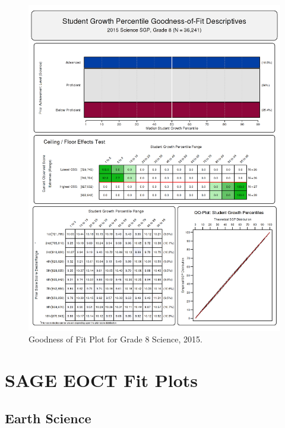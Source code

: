 \documentclass[12pt]{article}
\begin{document}
\begin{figure}[htbp]
\centering
\includegraphics{../img/Goodness_of_Fit/SCIENCE.2015/2015_SCIENCE_8;2014_SCIENCE_7;2013_SCIENCE_6;2012_SCIENCE_5;2011_SCIENCE_4.png}
\caption{Goodness of Fit Plot for Grade 8 Science, 2015.}
\end{figure}

\pagebreak

\section{SAGE EOCT Fit Plots}\label{sage-eoct-fit-plots}

\subsection{Earth Science}\label{earth-science}
\end{document}
